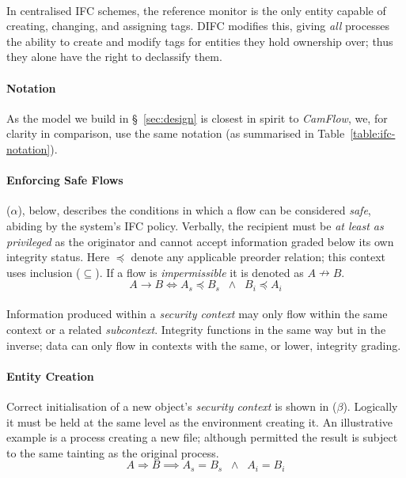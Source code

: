\paragraph{} In centralised IFC schemes, the reference monitor is the only entity capable of creating, changing, and assigning tags. DIFC modifies this, giving \textit{all} processes the ability to create and modify tags for entities they hold ownership over; thus they alone have the right to declassify them.

\paragraph{Notation} As the model we build in §~\ref{sec:design} is closest in spirit to \textit{CamFlow}, we, for clarity in comparison, use the same notation (as summarised in Table~\ref{table:ifc-notation}).

\paragraph{Enforcing Safe Flows} ($\alpha$), below, describes the conditions in which a flow can be considered \textit{safe}, abiding by the system's IFC policy. Verbally, the recipient must be \textit{at least as privileged} as the originator and cannot accept information graded below its own integrity status. Here $\preceq$ denote any applicable preorder relation; this context uses inclusion ($\subseteq$). If a flow is \textit{impermissible} it is denoted as $A \nrightarrow B$.
\begin{equation}
    A \rightarrow B \iff A_s \preceq B_s \;\; \land \;\; B_i \preceq A_i \tag{$\alpha$}
\end{equation}
\paragraph{} Information produced within a \textit{security context} may only flow within the same context or a related \textit{subcontext}. Integrity functions in the same way but in the inverse; data can only flow in contexts with the same, or lower, integrity grading.

\paragraph{Entity Creation} Correct initialisation of a new object's \textit{security context} is shown in ($\beta$). Logically it must be held at the same level as the environment creating it. An illustrative example is a process creating a new file; although permitted the result is subject to the same tainting as the original process.
\begin{equation}
    A \Rightarrow B \implies A_s = B_s \;\; \land \;\; A_i = B_i \tag{$\beta$}
\end{equation}

